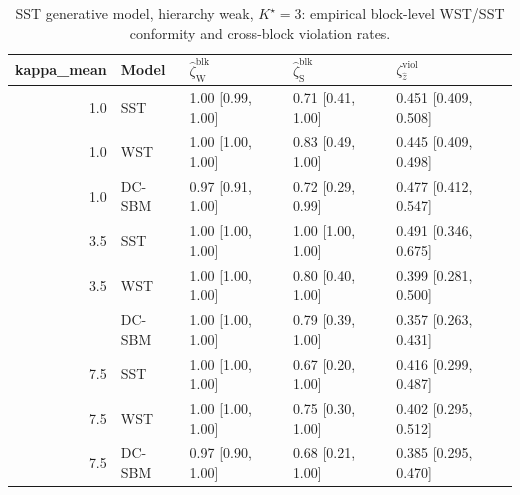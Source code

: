 \begin{table}
\centering
\caption{SST generative model, hierarchy weak, $K^\star=3$: empirical block-level WST/SST conformity and cross-block violation rates.}
\centering
\begin{tabular}[t]{rllll}
\toprule
kappa_mean & Model & $\widehat\zeta_{\mathrm{W}}^{\mathrm{blk}}$ & $\widehat\zeta_{\mathrm{S}}^{\mathrm{blk}}$ & $\zeta^{\mathrm{viol}}_{\hat z}$\\
\midrule
1.0 & SST & 1.00 [0.99, 1.00] & 0.71 [0.41, 1.00] & 0.451 [0.409, 0.508]\\
1.0 & WST & 1.00 [1.00, 1.00] & 0.83 [0.49, 1.00] & 0.445 [0.409, 0.498]\\
1.0 & DC-SBM & 0.97 [0.91, 1.00] & 0.72 [0.29, 0.99] & 0.477 [0.412, 0.547]\\
3.5 & SST & 1.00 [1.00, 1.00] & 1.00 [1.00, 1.00] & 0.491 [0.346, 0.675]\\
3.5 & WST & 1.00 [1.00, 1.00] & 0.80 [0.40, 1.00] & 0.399 [0.281, 0.500]\\
\addlinespace
3.5 & DC-SBM & 1.00 [1.00, 1.00] & 0.79 [0.39, 1.00] & 0.357 [0.263, 0.431]\\
7.5 & SST & 1.00 [1.00, 1.00] & 0.67 [0.20, 1.00] & 0.416 [0.299, 0.487]\\
7.5 & WST & 1.00 [1.00, 1.00] & 0.75 [0.30, 1.00] & 0.402 [0.295, 0.512]\\
7.5 & DC-SBM & 0.97 [0.90, 1.00] & 0.68 [0.21, 1.00] & 0.385 [0.295, 0.470]\\
\bottomrule
\end{tabular}
\end{table}
